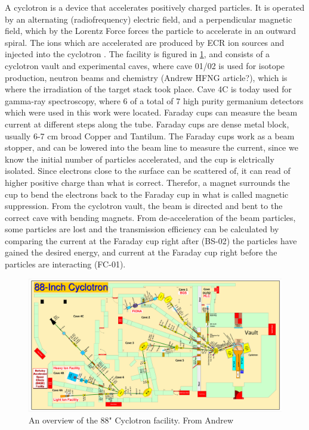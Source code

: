 \noindent 
A cyclotron is a device that accelerates positively charged particles. It is operated by an alternating (radiofrequency) electric field, and a perpendicular magnetic field, which by the Lorentz Force forces the particle to accelerate in an outward spiral. The ions which are accelerated are produced by ECR ion sources and injected into the cyclotron \cite{KireeffCovo2018a}. The facility is figured in \ref{fig:LBNL_88}, and consists of a cyclotron vault and
experimental caves, where cave 01/02 is used for isotope production, neutron beams and chemistry (Andrew HFNG article?), which is where the irradiation of the target stack took place. Cave 4C is today used for gamma-ray spectroscopy, where 6 of a total of 7 high purity germanium detectors which were used in this work were located. Faraday cups can measure the beam current at different steps along the tube. Faraday cups are dense metal block, usually 6-7 cm broad Copper and Tantilum. The Faraday cups work as a beam stopper, and can be lowered into the beam line to measure the current, since we know the initial number of particles accelerated, and the cup is elctrically isolated. Since electrons close to the surface can be scattered of, it can read of higher positive charge than what is correct. Therefor, a magnet surrounds the cup to bend the electrons back to the Faraday cup in what is called magnetic suppression. From the cyclotron vault, the beam is directed and bent to the correct cave with bending magnets. From de-acceleration of the beam particles, some particles are lost and the transmission efficiency can be calculated by comparing the current at the Faraday cup right after (BS-02) the particles have gained the desired energy, and current at the Faraday cup right before the particles are interacting (FC-01).  



\begin{figure}
    \centering
    \includegraphics[width=1\textwidth]{Experiment/Control-Room-Map.pdf}
    \caption{An overview of the 88" Cyclotron facility. From Andrew}
    \label{fig:LBNL_88}
\end{figure}

